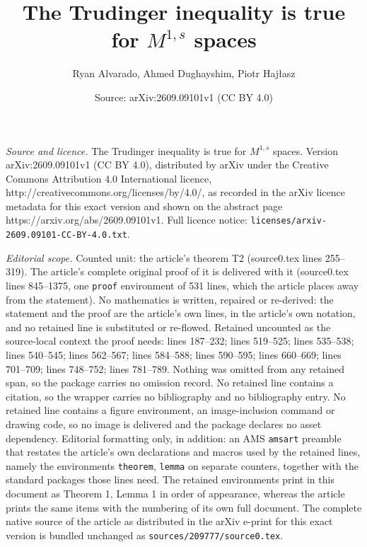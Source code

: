 \documentclass[10pt,a4paper]{amsart}
\title{The Trudinger inequality is true for $M^{1,s}$ spaces}
\author{Ryan Alvarado, Ahmed Dughayshim, Piotr Haj\l{}asz}
\date{Source: arXiv:2609.09101v1 (CC BY 4.0)}
\begin{document}
\maketitle

\noindent\emph{Source and licence.} The Trudinger inequality is true for $M^{1,s}$ spaces. Version arXiv:2609.09101v1 (CC BY 4.0), distributed by arXiv under the Creative Commons Attribution 4.0 International licence, http://creativecommons.org/licenses/by/4.0/, as recorded in the arXiv licence metadata for this exact version and shown on the abstract page https://arxiv.org/abs/2609.09101v1. Full licence notice: \texttt{licenses/arxiv-2609.09101-CC-BY-4.0.txt}.\par\smallskip

\noindent\textit{Editorial scope.} Counted unit: the article's theorem T2 (source0.tex lines 255--319). The article's complete original proof of it is delivered with it (source0.tex lines 845--1375, one \texttt{proof} environment of 531 lines, which the article places away from the statement). No mathematics is written, repaired or re-derived: the statement and the proof are the article's own lines, in the article's own notation, and no retained line is substituted or re-flowed.  Retained uncounted as the source-local context the proof needs: lines 187--232; lines 519--525; lines 535--538; lines 540--545; lines 562--567; lines 584--588; lines 590--595; lines 660--669; lines 701--709; lines 748--752; lines 781--789.  Nothing was omitted from any retained span, so the package carries no omission record.  No retained line contains a citation, so the wrapper carries no bibliography and no bibliography entry.  No retained line contains a figure environment, an image-inclusion command or drawing code, so no image is delivered and the package declares no asset dependency.  Editorial formatting only, in addition: an AMS \texttt{amsart} preamble that restates the article's own declarations and macros used by the retained lines, namely the environments \texttt{theorem}, \texttt{lemma} on separate counters, together with the standard packages those lines need.  The retained environments print in this document as Theorem 1, Lemma 1 in order of appearance, whereas the article prints the same items with the numbering of its own full document.  The complete native source of the article as distributed in the arXiv e-print for this exact version is bundled unchanged as \texttt{sources/209777/source0.tex}.
\end{document}
